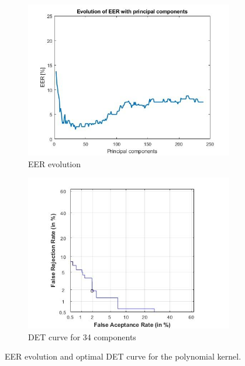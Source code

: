 \documentclass[11pt]{article}
\begin{document}
\begin{figure}[h!]
  \centering
       \begin{subfigure}[t]{0.4\textwidth}
         \centering
         \includegraphics[scale=0.55]{img/3b_poly_eer}
         \caption{EER evolution}
     \end{subfigure}%
     \quad\quad
     \begin{subfigure}[t]{0.4\textwidth}
         \centering
         \includegraphics[scale=0.55]{img/3b_poly_det}
         \caption{DET curve for 34 components}
     \end{subfigure}
    \caption{EER evolution and optimal DET curve for the polynomial kernel.}
    \label{fig:ex3b_poly}
\end{figure}
\end{document}
